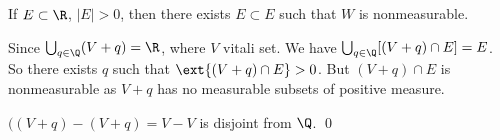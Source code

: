 \begin{thm}
If $E \subset \R$, $|E|>0$, then there exists $E \subset E$ such that $W$ is nonmeasurable. 
\end{thm}

\pf Since $\bigcup_{q \in \Q} (V+q)=\R$, where $V$ vitali set. We have $\bigcup_{q \in \Q} [(V+q) \cap E]=E$. So there exists $q$ such that $\ext{(V+q) \cap E} >0$. But $(V+q) \cap E$ is nonmeasurable as $V+q$ has no measurable subsets of positive measure. 

$((V+q)-(V+q)= V-V$ is disjoint from $\Q$. \qed \\
































